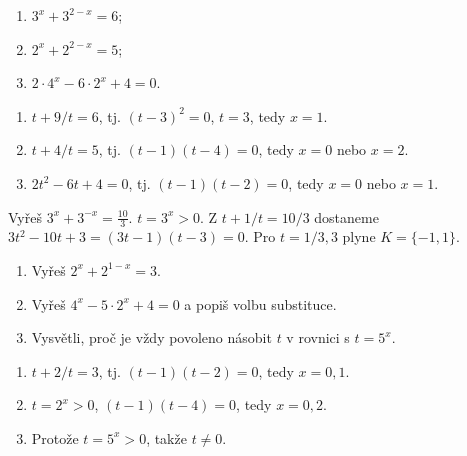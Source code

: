 \documentclass[11pt,a4paper]{article}
\begin{document}
\begin{zadaniReseniBox}[title={Samostatná práce 1}]
\begin{enumerate}[label=\alph*)]
\item $3^x+3^{2-x}=6$;
\item $2^x+2^{2-x}=5$;
\item $2\cdot4^x-6\cdot2^x+4=0$.
\end{enumerate}
\tcblower
\begin{enumerate}[label=\alph*)]
\item $t+9/t=6$, tj. $(t-3)^2=0$, $t=3$, tedy $x=1$.
\item $t+4/t=5$, tj. $(t-1)(t-4)=0$, tedy $x=0$ nebo $x=2$.
\item $2t^2-6t+4=0$, tj. $(t-1)(t-2)=0$, tedy $x=0$ nebo $x=1$.
\end{enumerate}
\end{zadaniReseniBox}
\begin{zadaniReseniBox}[title={Rozšíření 1}]
Vyřeš $3^{x}+3^{-x}=\frac{10}{3}$.
\tcblower
$t=3^x>0$. Z $t+1/t=10/3$ dostaneme $3t^2-10t+3=(3t-1)(t-3)=0$. Pro $t=1/3,3$ plyne $K=\{-1,1\}$.
\end{zadaniReseniBox}
\begin{zadaniReseniBox}[title={Domácí úkol}]
\begin{enumerate}[label=\alph*)]
\item Vyřeš $2^x+2^{1-x}=3$.
\item Vyřeš $4^x-5\cdot2^x+4=0$ a popiš volbu substituce.
\item Vysvětli, proč je vždy povoleno násobit $t$ v rovnici s $t=5^x$.
\end{enumerate}
\tcblower
\begin{enumerate}[label=\alph*)]
\item $t+2/t=3$, tj. $(t-1)(t-2)=0$, tedy $x=0,1$.
\item $t=2^x>0$, $(t-1)(t-4)=0$, tedy $x=0,2$.
\item Protože $t=5^x>0$, takže $t\ne0$.
\end{enumerate}
\end{zadaniReseniBox}
\end{document}

